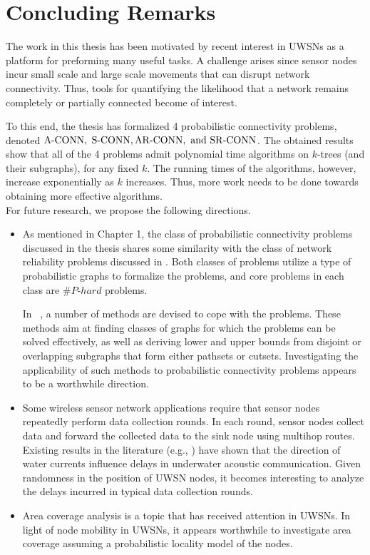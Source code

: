 \chapter{Concluding Remarks}
The work in this thesis has been motivated by recent interest in UWSNs as a platform for preforming many useful tasks. A challenge arises since sensor nodes incur small scale and large scale movements that can disrupt network connectivity. Thus, tools for quantifying the likelihood that a network remains completely or partially connected become of interest.

To this end, the thesis has formalized 4 probabilistic connectivity problems, denoted ${\mathrm {A\mbox{-}CONN}},$ $ {\mathrm {S\mbox{-}CONN}}, {\mathrm {AR\mbox{-}CONN}}, \mbox{ and } {\mathrm {SR\mbox{-}CONN}}$. The obtained results show that all of the 4 problems admit polynomial time algorithms on $k$-trees (and their subgraphs), for any fixed $k$. The running times of the algorithms, however, increase exponentially as $k$ increases. Thus, more work needs to be done towards obtaining more effective algorithms.\\
For future research, we propose the following directions.
\begin{itemize}[noitemsep]
\item As mentioned in Chapter 1, the class of probabilistic connectivity problems discussed in the thesis shares some similarity with the class of network reliability problems discussed in \cite{Co87, shier1991network}. Both classes of problems utilize a type of probabilistic graphs to formalize the problems, and core problems in each class are $\#P\mbox{-}hard$ problems.

In ~\cite{Co87}, a number of methods are devised to cope with the problems. These methods aim at finding classes of graphs for which the problems can be solved effectively, as well as deriving lower and upper bounds from disjoint or overlapping subgraphs that form either pathsets or cutsets. Investigating the applicability of such methods to probabilistic connectivity problems appears to be a worthwhile direction.

\item Some wireless sensor network applications require that sensor nodes repeatedly perform data collection rounds. In each round, sensor nodes collect data and forward the collected data to the sink node using multihop routes. Existing results in the literature (e.g., \cite{pu2013comparing}) have shown that the direction of water currents influence delays in underwater acoustic communication. Given randomness in the position of UWSN nodes, it becomes interesting to analyze the delays incurred in typical data collection rounds.
\item Area coverage analysis is a topic that has received attention in UWSNs. In light of node mobility in UWSNs, it appears worthwhile to investigate area coverage assuming a probabilistic locality model of the nodes.
\end{itemize}


